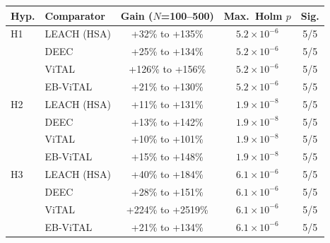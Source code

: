 \begin{tabular}{llccc}
\toprule
Hyp. & Comparator & Gain ($N$=100--500) & Max.\ Holm $p$ & Sig. \\
\midrule
H1 & LEACH (HSA) & +32\% to +135\% & $5.2\times10^{-6}$ & 5/5 \\
 & DEEC & +25\% to +134\% & $5.2\times10^{-6}$ & 5/5 \\
 & ViTAL & +126\% to +156\% & $5.2\times10^{-6}$ & 5/5 \\
 & EB-ViTAL & +21\% to +130\% & $5.2\times10^{-6}$ & 5/5 \\
\midrule
H2 & LEACH (HSA) & +11\% to +131\% & $1.9\times10^{-8}$ & 5/5 \\
 & DEEC & +13\% to +142\% & $1.9\times10^{-8}$ & 5/5 \\
 & ViTAL & +10\% to +101\% & $1.9\times10^{-8}$ & 5/5 \\
 & EB-ViTAL & +15\% to +148\% & $1.9\times10^{-8}$ & 5/5 \\
\midrule
H3 & LEACH (HSA) & +40\% to +184\% & $6.1\times10^{-6}$ & 5/5 \\
 & DEEC & +28\% to +151\% & $6.1\times10^{-6}$ & 5/5 \\
 & ViTAL & +224\% to +2519\% & $6.1\times10^{-6}$ & 5/5 \\
 & EB-ViTAL & +21\% to +134\% & $6.1\times10^{-6}$ & 5/5 \\
\bottomrule
\end{tabular}
